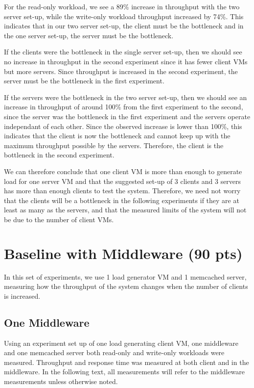 \documentclass[11pt,a4paper]{article}
\begin{document}
For the read-only workload, we see a 89\% increase in throughput with the two server set-up, while the write-only workload throughput increased by 74\%. This indicates that in our two server set-up, the client must be the bottleneck and in the one server set-up, the server must be the bottleneck.

If the clients were the bottleneck in the single server set-up, then we should see no increase in throughput in the second experiment since it has fewer client VMs but more servers. Since throughput is increased in the second experiment, the server must be the bottleneck in the first experiment.

If the servers were the bottleneck in the two server set-up, then we should see an increase in throughput of around 100\% from the first experiment to the second, since the server was the bottleneck in the first experiment and the servers operate independant of each other. Since the observed increase is lower than 100\%, this indicates that the client is now the bottleneck and cannot keep up with the maximum throughput possible by the servers. Therefore, the client is the bottleneck in the second experiment.

We can therefore conclude that one client VM is more than enough to generate load for one server VM and that the suggested set-up of 3 clients and 3 servers has more than enough clients to test the system. Therefore, we need not worry that the clients will be a bottleneck in the following experiments if they are at least as many as the servers, and that the measured limits of the system will not be due to the number of client VMs.

\newpage
\section{Baseline with Middleware (90 pts)}

In this set of experiments, we use 1 load generator VM and 1 memcached server, measuring how the throughput of the system changes when the number of clients is increased. 

\subsection{One Middleware}
Using an experiment set up of one load generating client VM, one middleware and one memcached server both read-only and write-only workloads were measured. Throughput and response time was measured at both client and in the middleware. In the following text, all measurements will refer to the middleware measurements unless otherwise noted.\\
\end{document}
